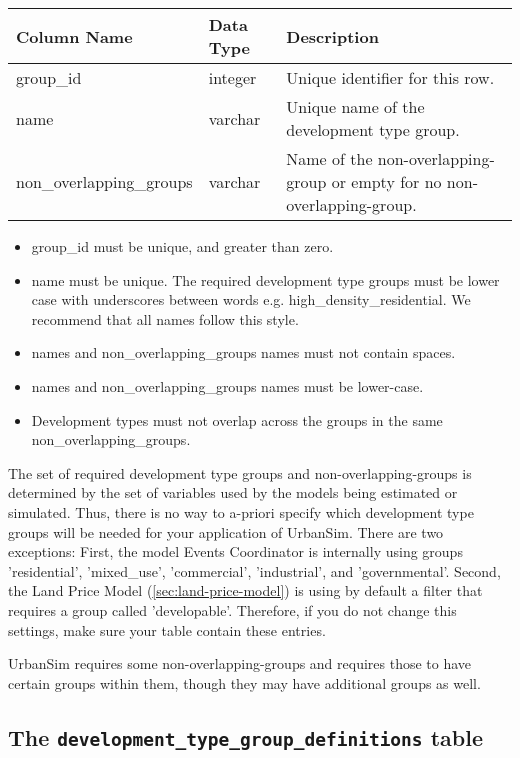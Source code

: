 \begin{tabular}{|l|l|l|}

\hline
\textbf{Column Name} & \textbf{Data Type} & \textbf{Description} \\

\hline group_id & integer & Unique identifier for this row.  \\

\hline name & varchar & Unique name of the development type group.  \\

\hline non_overlapping_groups & varchar & Name of the non-overlapping-group or
empty for no non-overlapping-group.  \\

\hline
\end{tabular}

\begin{itemize}
\tight
\item group_id must be unique, and greater than zero.
\item name must be unique. The required development type groups must be lower
case with underscores between words e.g. high_density_residential. We recommend
that all names follow this style.
\item names and non_overlapping_groups names must not contain spaces.
\item names and non_overlapping_groups names must be lower-case.
\item Development types must not overlap across the groups in the same
non_overlapping_groups.
\end{itemize}

The set of required development type groups and non-overlapping-groups is
determined by the set of variables used by the models being estimated or
simulated.  Thus, there is no way to a-priori specify which development type
groups will be needed for your application of UrbanSim. There are two exceptions:
First, the model Events Coordinator is internally using groups 'residential', 'mixed_use', 'commercial',
'industrial', and 'governmental'. Second, the Land Price Model (\ref{sec:land-price-model}) is using by default a filter
that requires a group called 'developable'. Therefore, if you do not change this settings, make sure your
table contain these entries.

UrbanSim requires some non-overlapping-groups and requires those to have
certain groups within them, though they may have additional groups as well.

\subsection{The {\tt development_type_group_definitions} table}

